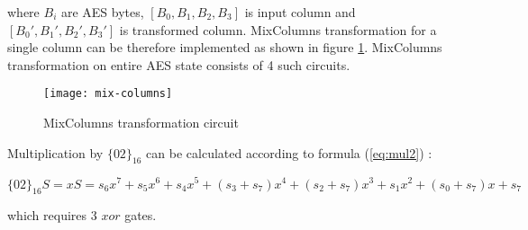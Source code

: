 where $B_i$ are AES bytes, $[B_0, B_1, B_2, B_3]$ is input column and $[B_0', B_1', B_2', B_3']$ is transformed column. MixColumns transformation for a single column can be therefore implemented as shown in figure \ref{fig:mix_columns}. MixColumns transformation on entire AES state consists of 4 such circuits.

\begin{figure}[!h]
\label{fig:mix_columns}

\centering
\texttt{[image: mix-columns]}

\caption{MixColumns transformation circuit}
\end{figure}

Multiplication by $\{02\}_{16}$ can be calculated according to formula (\ref{eq:mul2}) \cite{vlsi}: 

\begin{equation}
\label{eq:mul2}
\{02\}_{16}S = xS = s_6x^7 + s_5x^6 + s_4x^5 + (s_3 + s_7)x^4 + (s_2 + s_7)x^3 + s_1x^2 + (s_0 + s_7)x + s_7
\end{equation}

which requires 3 $xor$ gates.


